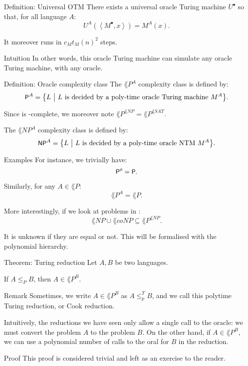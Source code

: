 \documentclass[a4paper]{article}
\begin{document}
\begin{parag}{Definition: Universal OTM}
    There exists a universal oracle Turing machine $U^{\bullet}$ so that, for all language $A$: 
    \[U^A\left(\left\langle M^{\bullet}, x \right\rangle\right) = M^A\left(x\right).\]
    
    It moreover runs in  $c_M t_M\left(n\right)^2$ steps.

    \begin{subparag}{Intuition}
        In other words, this oracle Turing machine can simulate any oracle Turing machine, with any oracle.
    \end{subparag}
\end{parag}

\begin{parag}{Definition: Oracle complexity class}
    The $\lang{P}^A$ complexity class is defined by: 
    \[\lang{P}^A = \left\{L \suchthat L \text{ is decided by a poly-time oracle Turing machine $M^A$}\right\}.\]

    Since  is -complete, we moreover note $\lang{P}^{\lang{NP}} = \lang{P}^{\lang{SAT}}$.
    
    The $\lang{NP}^A$ complexity class is defined by: 
    \[\lang{NP}^A = \left\{L \suchthat L \text{ is decided by a poly-time oracle NTM $M^A$}\right\}.\]

    \begin{subparag}{Examples}
        For instance, we trivially have: 
        \[\lang{P}^\o = \lang{P}.\]

        Similarly, for any $A \in \lang{P}$: 
        \[\lang{P}^A = \lang{P}.\]

        More interestingly, if we look at problems in : 
        \[\lang{NP} \cup \lang{coNP} \subseteq \lang{P}^{\lang{NP}}.\]

        It is unknown if they are equal or not. This will be formalised with the polynomial hierarchy.
    \end{subparag}
\end{parag}

\begin{parag}{Theorem: Turing reduction}
    Let $A, B$ be two languages.

    If $A \leq_P B$, then $A \in \lang{P}^B$.

    \begin{subparag}{Remark}
        Sometimes, we write $A \in \lang{P}^B$ as $A \leq_p^T B$, and we call this polytime Turing reduction, or Cook reduction.

        Intuitively, the reductions we have seen only allow a single call to the oracle: we must convert the problem $A$ to the problem $B$. On the other hand, if $A \in \lang{P}^{B}$, we can use a polynomial number of calls to the oral for $B$ in the reduction.
    \end{subparag}

    \begin{subparag}{Proof}
        This proof is considered trivial and left as an exercise to the reader. \wink
    \end{subparag}
\end{parag}
\end{document}

